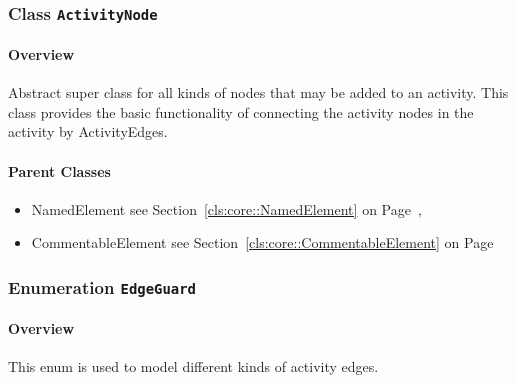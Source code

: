 \subsubsection{\Large{Class \bfseries \texttt{ActivityNode}\normalfont}}
\label{cls:storydiagrams::activities::ActivityNode} 
\paragraph{Overview}

	
			
Abstract super class for all kinds of nodes that may be added to an activity. This class provides the basic functionality of connecting the activity nodes in the activity by ActivityEdges.	
		
	



\paragraph{Parent Classes}
\begin{itemize}
\item NamedElement see Section~\ref{cls:core::NamedElement} on Page~\pageref{cls:core::NamedElement}, \item CommentableElement see Section~\ref{cls:core::CommentableElement} on Page~\pageref{cls:core::CommentableElement}\end{itemize}
\subsubsection{\Large{Enumeration \bfseries \texttt{EdgeGuard}\normalfont}}
\label{cls:storydiagrams::activities::EdgeGuard} 
\paragraph{Overview}
	
			
This enum is used to model different kinds of activity edges. 	
		
	


